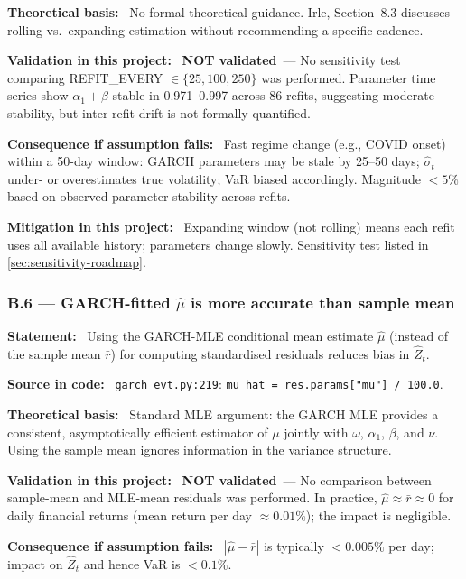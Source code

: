 \documentclass[11pt,a4paper]{article}
\newcommand{\asmfield}[1]{\medskip\noindent\textbf{#1:}\ }
\newcommand{\code}[1]{\texttt{#1}}
\newcommand{\notvalidated}{\textbf{NOT validated}}
\begin{document}
\asmfield{Theoretical basis}
No formal theoretical guidance. Irle, Section~8.3 discusses rolling vs.\
expanding estimation without recommending a specific cadence.

\asmfield{Validation in this project}
\notvalidated\ --- No sensitivity test comparing REFIT\_EVERY $\in
\{25, 100, 250\}$ was performed. Parameter time series show $\alpha_1 +
\beta$ stable in 0.971--0.997 across 86 refits, suggesting moderate
stability, but inter-refit drift is not formally quantified.

\asmfield{Consequence if assumption fails}
Fast regime change (e.g., COVID onset) within a 50-day window: GARCH
parameters may be stale by 25--50 days; $\hat{\sigma}_t$ under- or
overestimates true volatility; VaR biased accordingly. Magnitude $< 5\%$
based on observed parameter stability across refits.

\asmfield{Mitigation in this project}
Expanding window (not rolling) means each refit uses all available history;
parameters change slowly. Sensitivity test listed in
\cref{sec:sensitivity-roadmap}.

\subsubsection{B.6 --- GARCH-fitted $\hat{\mu}$ is more accurate than sample mean}\label{asm:B6}

\asmfield{Statement}
Using the GARCH-MLE conditional mean estimate $\hat{\mu}$ (instead of the
sample mean $\bar{r}$) for computing standardised residuals reduces bias
in $\hat{Z}_t$.

\asmfield{Source in code}
\code{garch\_evt.py:219}: \lstinline|mu_hat = res.params["mu"] / 100.0|.

\asmfield{Theoretical basis}
Standard MLE argument: the GARCH MLE provides a consistent, asymptotically
efficient estimator of $\mu$ jointly with $\omega$, $\alpha_1$, $\beta$,
and $\nu$. Using the sample mean ignores information in the variance
structure.

\asmfield{Validation in this project}
\notvalidated\ --- No comparison between sample-mean and MLE-mean residuals
was performed. In practice, $\hat{\mu} \approx \bar{r} \approx 0$ for daily
financial returns (mean return per day $\approx 0.01\%$); the impact is
negligible.

\asmfield{Consequence if assumption fails}
$|\hat{\mu} - \bar{r}|$ is typically $< 0.005\%$ per day; impact on $\hat{Z}_t$
and hence VaR is $< 0.1\%$.
\end{document}

